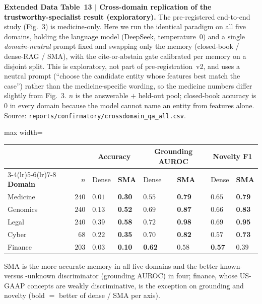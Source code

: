 \documentclass[pdflatex,sn-nature]{sn-jnl}
\newcommand{\edcaption}[1]{\par{\small #1}\par\smallskip}
\begin{document}
\begin{appendices}
\begin{table}[htbp]
\centering
\edcaption{\textbf{Extended Data Table~13 $|$ Cross-domain replication of the
    trustworthy-specialist result (exploratory).}
  The pre-registered end-to-end study (Fig.~3) is medicine-only. Here we run the
  identical paradigm on all five domains, holding the language model (DeepSeek,
  temperature~0) and a single \emph{domain-neutral} prompt fixed and swapping only
  the memory (closed-book / dense-RAG / SMA), with the cite-or-abstain gate
  calibrated per memory on a disjoint split. This is exploratory, not part of
  pre-registration~v2, and uses a neutral prompt (``choose the candidate entity
  whose features best match the case'') rather than the medicine-specific wording,
  so the medicine numbers differ slightly from Fig.~3. $n$ is the answerable
  ${+}$ held-out pool; closed-book accuracy is $0$ in every domain because the model
  cannot name an entity from features alone.
  Source: \texttt{reports/confirmatory/crossdomain\_qa\_all.csv}.}
\small
\setlength{\tabcolsep}{5pt}
\begin{adjustbox}{max width=\textwidth}
\begin{tabular}{lr ll ll ll}
\toprule
 & & \multicolumn{2}{c}{\textbf{Accuracy}} & \multicolumn{2}{c}{\textbf{Grounding AUROC}}
   & \multicolumn{2}{c}{\textbf{Novelty F1}} \\
\cmidrule(lr){3-4}\cmidrule(lr){5-6}\cmidrule(lr){7-8}
\textbf{Domain} & \textbf{$n$} & Dense & \textbf{SMA} & Dense & \textbf{SMA}
   & Dense & \textbf{SMA} \\
\midrule
Medicine & $240$ & $0.01$ & \textbf{0.30} & $0.55$ & \textbf{0.79} & $0.65$ & \textbf{0.79} \\
Genomics & $240$ & $0.13$ & \textbf{0.52} & $0.69$ & \textbf{0.87} & $0.66$ & \textbf{0.83} \\
Legal    & $240$ & $0.39$ & \textbf{0.58} & $0.72$ & \textbf{0.98} & $0.69$ & \textbf{0.95} \\
Cyber    & $68$  & $0.22$ & \textbf{0.35} & $0.70$ & \textbf{0.82} & $0.57$ & \textbf{0.73} \\
Finance  & $203$ & $0.03$ & \textbf{0.10} & \textbf{0.62} & $0.58$ & \textbf{0.57} & $0.39$ \\
\bottomrule
\end{tabular}
\end{adjustbox}
\begin{flushleft}{\footnotesize
SMA is the more accurate memory in all five domains and the better known-versus
-unknown discriminator (grounding AUROC) in four; finance, whose US-GAAP concepts
are weakly discriminative, is the exception on grounding and novelty (bold $=$
better of dense / SMA per axis).}
\end{flushleft}
\label{tab:ed13_crossdomain_qa}
\end{table}



\end{appendices}
\end{document}
